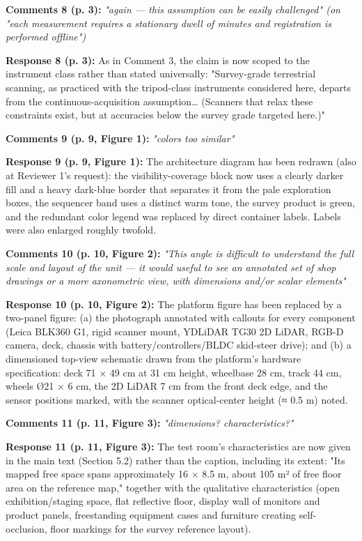 \documentclass[11pt]{article}
\begin{document}
\medskip

\textbf{Comments 8 (p. 3):} \emph{"again — this assumption can be easily challenged" \emph{(on "each measurement requires a stationary dwell of minutes and registration is performed offline")}}

\textbf{Response 8 (p. 3):} As in Comment 3, the claim is now scoped to the instrument class rather than stated universally: "Survey-grade terrestrial scanning, as practiced with the tripod-class instruments considered here, departs from the continuous-acquisition assumption… (Scanners that relax these constraints exist, but at accuracies below the survey grade targeted here.)"

\medskip

\textbf{Comments 9 (p. 9, Figure 1):} \emph{"colors too similar"}

\textbf{Response 9 (p. 9, Figure 1):} The architecture diagram has been redrawn (also at Reviewer 1's request): the visibility-coverage block now uses a clearly darker fill and a heavy dark-blue border that separates it from the pale exploration boxes, the sequencer band uses a distinct warm tone, the survey product is green, and the redundant color legend was replaced by direct container labels. Labels were also enlarged roughly twofold.

\medskip

\textbf{Comments 10 (p. 10, Figure 2):} \emph{"This angle is difficult to understand the full scale and layout of the unit — it would useful to see an annotated set of shop drawings or a more axonometric view, with dimensions and/or scalar elements"}

\textbf{Response 10 (p. 10, Figure 2):} The platform figure has been replaced by a two-panel figure: (a) the photograph annotated with callouts for every component (Leica BLK360 G1, rigid scanner mount, YDLiDAR TG30 2D LiDAR, RGB-D camera, deck, chassis with battery/controllers/BLDC skid-steer drive); and (b) a dimensioned top-view schematic drawn from the platform's hardware specification: deck 71 × 49 cm at 31 cm height, wheelbase 28 cm, track 44 cm, wheels Ø21 × 6 cm, the 2D LiDAR 7 cm from the front deck edge, and the sensor positions marked, with the scanner optical-center height (≈ 0.5 m) noted.

\medskip

\textbf{Comments 11 (p. 11, Figure 3):} \emph{"dimensions? characteristics?"}

\textbf{Response 11 (p. 11, Figure 3):} The test room's characteristics are now given in the main text (Section 5.2) rather than the caption, including its extent: "Its mapped free space spans approximately 16 × 8.5 m, about 105 m² of free floor area on the reference map," together with the qualitative characteristics (open exhibition/staging space, flat reflective floor, display wall of monitors and product panels, freestanding equipment cases and furniture creating self-occlusion, floor markings for the survey reference layout).
\end{document}
